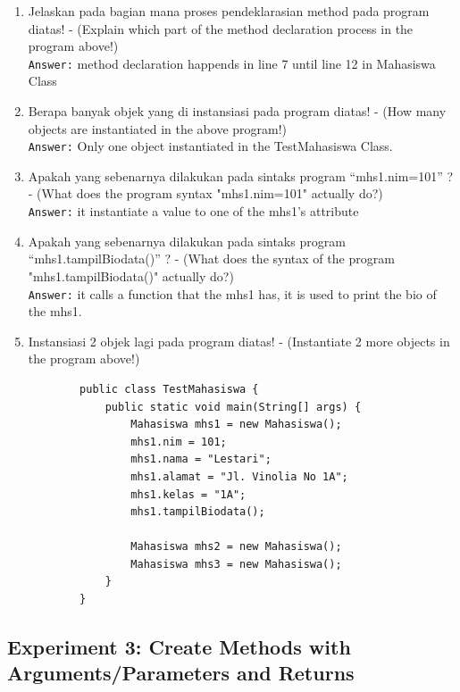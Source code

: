 \documentclass[12pt,titlepage]{article}
\begin{document}
\begin{enumerate}
    \item Jelaskan pada bagian mana proses pendeklarasian method pada program diatas! - (Explain which part of the method declaration process in the program above!) \\
    \texttt{Answer:} method declaration happends in line 7 until line 12 in Mahasiswa Class
    \item Berapa banyak objek yang di instansiasi pada program diatas! - (How many objects are instantiated in the above program!) \\
    \texttt{Answer:} Only one object instantiated in the TestMahasiswa Class.
    \item Apakah yang sebenarnya dilakukan pada sintaks program “mhs1.nim=101” ? - (What does the program syntax "mhs1.nim=101" actually do?) \\
    \texttt{Answer:} it instantiate a value to one of the mhs1's attribute
    \item Apakah yang sebenarnya dilakukan pada sintaks program “mhs1.tampilBiodata()” ? - (What does the syntax of the program "mhs1.tampilBiodata()" actually do?) \\
    \texttt{Answer:} it calls a function that the mhs1 has, it is used to print the bio of the mhs1.
    \item Instansiasi 2 objek lagi pada program diatas! - (Instantiate 2 more objects in the program above!)
    \begin{verbatim}
        public class TestMahasiswa {
            public static void main(String[] args) {
                Mahasiswa mhs1 = new Mahasiswa();
                mhs1.nim = 101;
                mhs1.nama = "Lestari";
                mhs1.alamat = "Jl. Vinolia No 1A";
                mhs1.kelas = "1A";
                mhs1.tampilBiodata();

                Mahasiswa mhs2 = new Mahasiswa();
                Mahasiswa mhs3 = new Mahasiswa();
            }
        }
    \end{verbatim}
\end{enumerate}

\subsection{Experiment 3: Create Methods with Arguments/Parameters and Returns}
\end{document}
